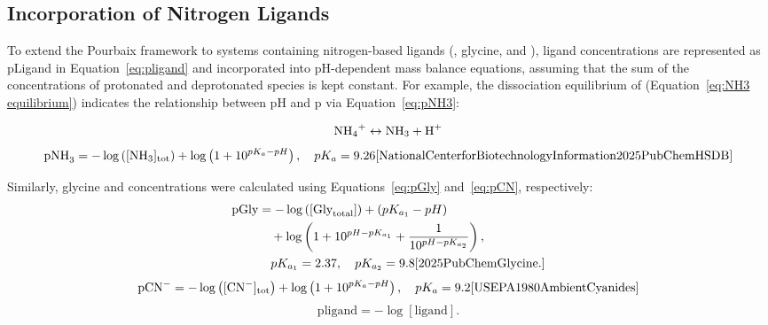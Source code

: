 \documentclass[journal=jacsat,manuscript=article]{achemso}
\begin{document}


\subsection{Incorporation of Nitrogen Ligands}

To extend the Pourbaix framework to systems containing nitrogen-based ligands (, glycine, and ), ligand concentrations are represented as pLigand in Equation~\eqref{eq:pligand} and incorporated into pH-dependent mass balance equations, assuming that the sum of the concentrations of protonated and deprotonated species is kept constant. For example, the dissociation equilibrium of  (Equation~\eqref{eq:NH3 equilibrium}) indicates the relationship between pH and p via Equation~\eqref{eq:pNH3}:

\begin{equation} \label{eq:NH3 equilibrium}
\ce{NH4+} \leftrightarrow \ce{NH3} + \ce{H+}
\end{equation}
\begin{equation} \label{eq:pNH3}
\text{pNH}_3 = -\log \left([\text{NH}_3]_{\text{tot}}\right) + \log \left(1 + 10^{pK_a - pH} \right), \quad pK_a = 9.26 \cite{NationalCenterforBiotechnologyInformation2025PubChemHSDB}
\end{equation}

Similarly, glycine and  concentrations were calculated using Equations~\eqref{eq:pGly} and~\eqref{eq:pCN}, respectively:
\begin{align} \label{eq:pGly}
\text{pGly} &= -\log \left([\text{Gly}_{\text{total}}]\right) + (pK_{a_1} - pH) \nonumber \\
&\quad + \log \left(1 + 10^{pH - pK_{a_1}} + \frac{1}{10^{pH - pK_{a_2}}} \right), \nonumber \\
&\quad pK_{a_1} = 2.37, \quad pK_{a_2} = 9.8 \cite{2025PubChemGlycine.}
\end{align}
\begin{equation} \label{eq:pCN}
\text{pCN}^- = -\log \left([\text{CN}^-]_{\text{tot}}\right) + \log \left(1 + 10^{pK_a - pH} \right), \quad pK_a = 9.2 \cite{USEPA1980AmbientCyanides}
\end{equation}
\begin{equation} \label{eq:pligand}
\text{pligand} = -\log[\text{ligand}].
\end{equation}
\end{document}
